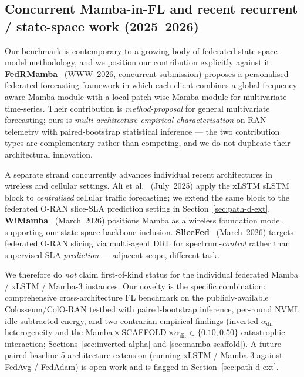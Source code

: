 \documentclass[journal]{IEEEtran}
\newcommand{\alphadir}{\ensuremath{\alpha_{\mathrm{dir}}}}
\begin{document}
\subsection{Concurrent {Mamba}-in-FL and recent recurrent / state-space work (2025--2026)}\label{sec:related-concurrent}

Our benchmark is contemporary to a growing body of federated state-space-model methodology, and we position our contribution explicitly against it. \textbf{FedRMamba}~\cite{FedRMamba2026} (WWW~2026, concurrent submission) proposes a personalised federated forecasting framework in which each client combines a global frequency-aware Mamba module with a local patch-wise Mamba module for multivariate time-series. Their contribution is \emph{method-proposal} for general multivariate forecasting; ours is \emph{multi-architecture empirical characterisation} on RAN telemetry with paired-bootstrap statistical inference --- the two contribution types are complementary rather than competing, and we do not duplicate their architectural innovation.

A separate strand concurrently advances individual recent architectures in wireless and cellular settings. Ali et al.~\cite{Ali2025_xLSTMCellular} (July~2025) apply the xLSTM sLSTM block to \emph{centralised} cellular traffic forecasting; we extend the same block to the federated O-RAN slice-SLA prediction setting in Section~\ref{sec:path-d-ext}. \textbf{WiMamba}~\cite{Raviv2026_WiMamba} (March~2026) positions Mamba as a wireless foundation model, supporting our state-space backbone inclusion. \textbf{SliceFed}~\cite{Mohammadi2026_SliceFed} (March~2026) targets federated O-RAN slicing via multi-agent DRL for spectrum-\emph{control} rather than supervised SLA \emph{prediction} --- adjacent scope, different task.

We therefore do \emph{not} claim first-of-kind status for the individual federated Mamba / xLSTM / Mamba-3 instances. Our novelty is the specific combination: comprehensive cross-architecture FL benchmark on the publicly-available Colosseum/ColO-RAN testbed with paired-bootstrap inference, per-round NVML idle-subtracted energy, and two contrarian empirical findings (inverted-$\alphadir$ heterogeneity and the Mamba\,$\times$\,SCAFFOLD\,$\times\alphadir{\in}\{0.10, 0.50\}$ catastrophic interaction; Sections~\ref{sec:inverted-alpha} and \ref{sec:mamba-scaffold}). A future paired-baseline 5-architecture extension (running xLSTM / Mamba-3 against FedAvg / FedAdam) is open work and is flagged in Section~\ref{sec:path-d-ext}.
\end{document}
